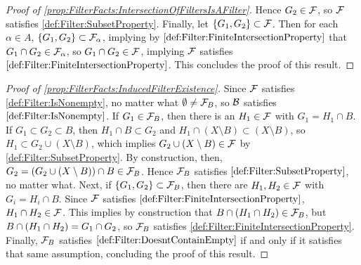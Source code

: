 \begin{prop}
\begin{proof}[Proof of \ref{prop:FilterFacts:IntersectionOfFiltersIsAFilter}]
        Hence $G_2 \in \mathcal{F}$, so $\mathcal{F}$ satisfies \ref{def:Filter:SubsetProperty}. 
        Finally, let $\{G_1,G_2\} \subset \mathcal{F}$. 
        Then for each $\alpha \in A$, $\{G_1,G_2\} \subset \mathcal{F}_\alpha$, 
        implying by $\ref{def:Filter:FiniteIntersectionProperty}$ that 
        $G_1 \cap G_2 \in \mathcal{F}_\alpha$, so $G_1\cap G_2 \in \mathcal{F}$, 
        implying $\mathcal{F}$ satisfies $\ref{def:Filter:FiniteIntersectionProperty}$. 
        This concludes the proof of this result. 
    \end{proof}
    \begin{proof}[Proof of \ref{prop:FilterFacts:InducedFilterExistence}]
       Since $\mathcal{F}$ satisfies \ref{def:Filter:IsNonempty}, 
       no matter what $\emptyset \neq \mathcal{F}_B$, 
       so $\mathcal{B}$ satisfies $\ref{def:Filter:IsNonempty}$.
       If $G_1 \in \mathcal{F}_B$, then there is an $H_1 \in \mathcal{F}$ with $G_1 = H_1 \cap B$. 
       If $G_1 \subset G_2 \subset B$, 
       then $H_1 \cap B \subset G_2$ 
       and $H_1 \cap (X \setminus B) \subset (X \setminus B)$, 
       so $H_1 \subset G_2 \cup (X \setminus B)$, 
       which implies $G_2 \cup (X \setminus B) \in \mathcal{F}$ by \ref{def:Filter:SubsetProperty}.
       By construction, then, $G_2 = \left( G_2 \cup (X \setminus B) \right) \cap B \in \mathcal{F}_B$.
       Hence $\mathcal{F}_B$ satisfies $\ref{def:Filter:SubsetProperty}$, no matter what. 
       Next, if $\{G_1, G_2 \} \subset \mathcal{F}_B$, then there are $H_1,H_2 \in \mathcal{F}$ 
       with $G_i = H_i \cap B$. 
       Since $\mathcal{F}$ satisfies $\ref{def:Filter:FiniteIntersectionProperty}$, 
       $H_1 \cap H_2 \in \mathcal{F}$. 
       This implies by construction that $B \cap \left( H_1 \cap H_2\right) \in \mathcal{F}_B$, but 
       $B \cap \left( H_1 \cap H_2\right) = G_1 \cap G_2 $, so $\mathcal{F}_B$ satisfies 
       \ref{def:Filter:FiniteIntersectionProperty}. 
       Finally, 
       $\mathcal{F}_B$ satisfies $\ref{def:Filter:DoesntContainEmpty}$ 
       if and only if it satisfies that same assumption, concluding the proof of this result. 
    \end{proof}
\end{prop}

